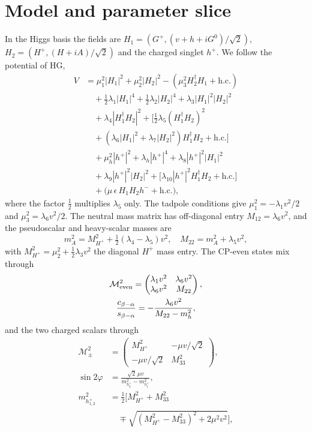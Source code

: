 \documentclass[twocolumn,epjc3]{svjour3}
\begin{document}
\section{Model and parameter slice}\label{sec:model}
In the Higgs basis the fields are $H_1=(G^+,(v+h+iG^0)/\sqrt2)$, $H_2=(H^+,(H+iA)/\sqrt2)$ and the charged singlet $h^+$. We follow the potential of HG,
\begin{align}
V &= \mu_1^2|H_1|^2+\mu_2^2|H_2|^2-(\mu_3^2 H_2^\dagger H_1+\text{h.c.})\nonumber\\
&\quad+\tfrac12\lambda_1|H_1|^4+\tfrac12\lambda_2|H_2|^4+\lambda_3|H_1|^2|H_2|^2\nonumber\\
&\quad+\lambda_4|H_1^\dagger H_2|^2+\big[\tfrac12\lambda_5(H_1^\dagger H_2)^2\nonumber\\
&\quad+(\lambda_6|H_1|^2+\lambda_7|H_2|^2)H_1^\dagger H_2+\text{h.c.}\big]\nonumber\\
&\quad+\mu_h^2|h^+|^2+\lambda_h|h^+|^4+\lambda_8|h^+|^2|H_1|^2\nonumber\\
&\quad+\lambda_9|h^+|^2|H_2|^2+\big[\lambda_{10}|h^+|^2H_1^\dagger H_2+\text{h.c.}\big]\nonumber\\
&\quad+\big(\mu\,\epsilon\,H_1H_2h^-+\text{h.c.}\big),
\end{align}
where the factor $\tfrac12$ multiplies $\lambda_5$ only. The tadpole conditions give $\mu_1^2=-\lambda_1v^2/2$ and $\mu_3^2=\lambda_6v^2/2$. The neutral mass matrix has off-diagonal entry $M_{12}=\lambda_6v^2$, and the pseudoscalar and heavy-scalar masses are
\begin{equation}
m_A^2=M_{H^+}^2+\tfrac12(\lambda_4-\lambda_5)v^2,\quad M_{22}=m_A^2+\lambda_5v^2,
\end{equation}
with $M_{H^+}^2=\mu_2^2+\tfrac12\lambda_3v^2$ the diagonal $H^+$ mass entry. The CP-even states mix through
\begin{gather}
\mathcal M^2_{\rm even}=\begin{pmatrix}\lambda_1v^2&\lambda_6v^2\\ \lambda_6v^2&M_{22}\end{pmatrix},\nonumber\\
\frac{c_{\beta-\alpha}}{s_{\beta-\alpha}}=-\frac{\lambda_6v^2}{M_{22}-m_h^2},
\end{gather}
and the two charged scalars through
\begin{align}
\mathcal M^2_{\pm}&=\begin{pmatrix}M_{H^+}^2&-\mu v/\sqrt2\\ -\mu v/\sqrt2&M_{33}^2\end{pmatrix},\nonumber\\
\sin2\varphi&=\frac{\sqrt2\,\mu v}{m^2_{h_2^+}-m^2_{h_1^+}},\nonumber\\
m^2_{h_{1,2}^+}&=\tfrac12\Big[M_{H^+}^2+M_{33}^2\nonumber\\
&\quad\mp\sqrt{(M_{H^+}^2-M_{33}^2)^2+2\mu^2v^2}\Big],
\label{eq:charged}
\end{align}
\end{document}
